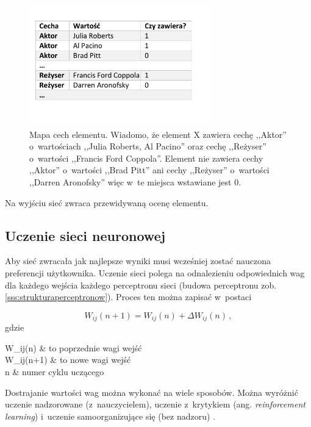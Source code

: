 \documentclass[twoside]{iisthesis}
\begin{document}
		 \begin{figure}[!ht]
		 	\centering
		 	\includegraphics[width=0.7\textwidth]{mapacech}
		 	\caption{Mapa cech elementu. Wiadomo, że element X zawiera cechę ,,Aktor'' o~wartościach ,,Julia Roberts, Al Pacino'' oraz cechę ,,Reżyser'' o~wartości ,,Francis Ford Coppola''. Element nie zawiera cechy ,,Aktor'' o~wartości ,,Brad Pitt'' ani cechy ,,Reżyser'' o~wartości ,,Darren Aronofsky'' więc w~te miejsca wstawiane jest $0$.}
		 	\label{fig:mapacech}
		 \end{figure}
		 
		 Na wyjściu sieć zwraca przewidywaną ocenę elementu.
		 		 
		 
	 \subsection{Uczenie sieci neuronowej}
		 \label{ss:uczeniesiecineuronowej}
		 
		 Aby sieć zwracała jak najlepsze wyniki musi wcześniej zostać nauczona preferencji użytkownika. Uczenie sieci polega na odnalezieniu odpowiednich wag dla każdego wejścia każdego perceptronu sieci (budowa perceptronu zob. \ref{sss:strukturaperceptronow}). Proces ten można zapisać w~postaci
		 
		 \begin{equation}
		 \label{eq:weightadaptation}
		 W_{ij}(n+1) = W_{ij}(n) + \Delta W_{ij}(n) 
		 \,,
		 \end{equation}		 		 
		 gdzie
		 
		 \begin{conditions*}
		 	W_{ij}(n) & to poprzednie wagi wejść \\
		 	W_{ij}(n+1) & to nowe wagi wejść \\
		 	n & numer cyklu uczącego 
		 \end{conditions*} 
		 
		 Dostrajanie wartości wag można wykonać na wiele sposobów. Można wyróżnić uczenie nadzorowane (z~nauczycielem), uczenie z~krytykiem (ang. \textit{reinforcement learning}) i~uczenie samoorganizujące się (bez nadzoru) \cite{osowski1996sieci}.
		 
\end{document}
